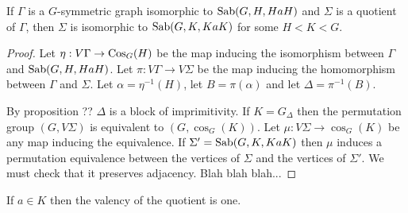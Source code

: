 \begin{theorem} [Lorimer]
If $\Gamma$ is a $G$-symmetric graph isomorphic to $\operatorname{Sab}(G,H,HaH)$
and $\Sigma$ is a quotient of $\Gamma$,
then $\Sigma$ is isomorphic to $\operatorname{Sab}(G,K,KaK)$ for some $H < K < G$.
\begin{proof}
Let $\eta : V \Gamma \to \operatorname{Cos}_G(H)$ be the map inducing
the isomorphism between $\Gamma$ and $\operatorname{Sab}(G,H,HaH)$.
Let $\pi : V \Gamma \to V \Sigma$ be the map
inducing the homomorphism between $\Gamma$ and $\Sigma$.
Let $\alpha = \eta^{-1}(H)$,
let $B = \pi(\alpha)$ and let $\Delta = \pi^{-1}(B)$.

By proposition ?? $\Delta$ is a block of imprimitivity.
If $K = G_{\Delta}$ then the permutation group $(G, V \Sigma)$
is equivalent to $(G, \cos_G(K))$.
Let $\mu : V \Sigma \to \cos_G(K)$ be any map
inducing the equivalence.
If $\Sigma' = \operatorname{Sab}(G,K,KaK)$ then $\mu$ induces
a permutation equivalence between the vertices of $\Sigma$
and the vertices of $\Sigma'$.
We must check that it preserves adjacency. Blah blah blah...


\end{proof}
\end{theorem}

If $a \in K$ then the valency of the quotient is one.

